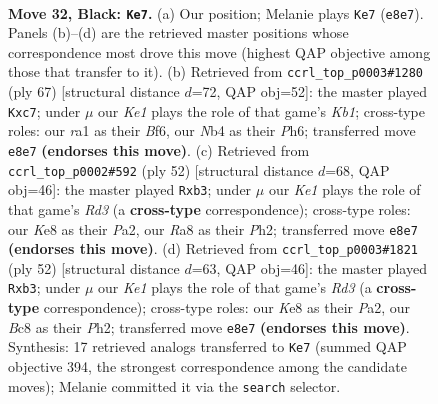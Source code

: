 \documentclass[11pt]{article}
\begin{document}
\clearpage

\begin{figure}[p]\centering
\begin{subfigure}{0.46\textwidth}\centering
\resizebox{\linewidth}{!}{%
\newchessgame
\chessboard[
  setfen={r1bNkbn1/p1p5/P1p1p3/8/1n3P2/8/3R4/RNB1K3 b Q - 0 32},
  showmover=false,
  pgfstyle=straightmove, color=movearrow, markmove={e8-e7}
]}
\caption{}
\end{subfigure}\hfill
\begin{subfigure}{0.46\textwidth}\centering
\resizebox{\linewidth}{!}{%
\newchessgame
\chessboard[
  setfen={1k6/1bN5/p1p2b1p/3pn3/1P3p2/1R5B/2P4K/6R1 b - - 0 34},
  showmover=false,
  pgfstyle=straightmove, color=movearrow, markmove={b8-c7}
]}
\caption{}
\end{subfigure}
\\[4pt]
\begin{subfigure}{0.46\textwidth}\centering
\resizebox{\linewidth}{!}{%
\newchessgame
\chessboard[
  setfen={2r4r/2N1Pk1p/ppbB2p1/8/8/1n1R4/P5PP/6K1 w - - 2 27},
  showmover=false,
  pgfstyle=straightmove, color=movearrow, markmove={d3-b3}
]}
\caption{}
\end{subfigure}\hfill
\begin{subfigure}{0.46\textwidth}\centering
\resizebox{\linewidth}{!}{%
\newchessgame
\chessboard[
  setfen={2r4r/2N1Pk1p/pp1B2p1/8/6b1/1n1R4/P5PP/6K1 w - - 2 27},
  showmover=false,
  pgfstyle=straightmove, color=movearrow, markmove={d3-b3}
]}
\caption{}
\end{subfigure}
\caption{\textbf{Move 32, Black: \texttt{Ke7}.} (a) Our position; Melanie plays \texttt{Ke7} (\texttt{e8e7}). Panels (b)--(d) are the retrieved master positions whose correspondence most drove this move (highest QAP objective among those that transfer to it). (b) Retrieved from \texttt{ccrl\_top\_p0003\#1280} (ply 67) [structural distance $d$=72, QAP obj=52]: the master played \texttt{Kxc7}; under $\mu$ our \emph{Ke1} plays the role of that game's \emph{Kb1}; cross-type roles: our \emph{r}a1 as their \emph{B}f6, our \emph{N}b4 as their \emph{P}h6; transferred move \texttt{e8e7} \textbf{(endorses this move)}. (c) Retrieved from \texttt{ccrl\_top\_p0002\#592} (ply 52) [structural distance $d$=68, QAP obj=46]: the master played \texttt{Rxb3}; under $\mu$ our \emph{Ke1} plays the role of that game's \emph{Rd3} (a \textbf{cross-type} correspondence); cross-type roles: our \emph{K}e8 as their \emph{P}a2, our \emph{R}a8 as their \emph{P}h2; transferred move \texttt{e8e7} \textbf{(endorses this move)}. (d) Retrieved from \texttt{ccrl\_top\_p0003\#1821} (ply 52) [structural distance $d$=63, QAP obj=46]: the master played \texttt{Rxb3}; under $\mu$ our \emph{Ke1} plays the role of that game's \emph{Rd3} (a \textbf{cross-type} correspondence); cross-type roles: our \emph{K}e8 as their \emph{P}a2, our \emph{B}c8 as their \emph{P}h2; transferred move \texttt{e8e7} \textbf{(endorses this move)}. Synthesis: 17 retrieved analogs transferred to \texttt{Ke7} (summed QAP objective 394, the strongest correspondence among the candidate moves); Melanie committed it via the \texttt{search} selector.}
\label{fig:thought-m63}
\end{figure}
\end{document}
